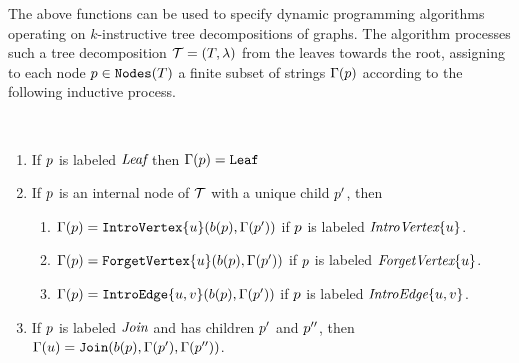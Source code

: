 


The above functions can be used to specify dynamic programming algorithms operating on $k$-instructive tree decompositions of graphs. The algorithm processes such a tree decomposition $\mathcal{T} = (T,\lambda)$ from the leaves towards the root, assigning to each node $p\in \texttt{Nodes}(T)$ a finite subset of strings $\Gamma(p)$ according to the following inductive process. 

\begin{definition}[Dynamization]\label{Dynamization}
$ $
\begin{enumerate}
\item If $p$ is labeled $\texttt{\it{Leaf}}$ then $\Gamma(p) = \texttt{Leaf}$%
\item If $p$ is an internal node of $\mathcal{T}$ with a unique child $p'$, then 
\begin{enumerate}
    \item $\Gamma(p) = \texttt{IntroVertex}\{u\}(b(p),\Gamma(p'))$ if $p$ is labeled $\texttt{\it{IntroVertex}}\{u\}$. 
    \item $\Gamma(p) = \texttt{ForgetVertex}\{u\}(b(p),\Gamma(p'))$ if $p$ is labeled $\texttt{\it{ForgetVertex}}\{u\}$.
    \item $\Gamma(p) = \texttt{IntroEdge}\{u,v\}(b(p),\Gamma(p'))$ if $p$ is labeled $\texttt{\it{IntroEdge}}\{u,v\}$. 
\end{enumerate}
\item If $p$ is labeled $\texttt{\it{Join}}$ and has children $p'$ and $p''$, then $\Gamma(u) = \texttt{Join}(b(p),\Gamma(p'),\Gamma(p''))$. 
\end{enumerate}
\end{definition}

